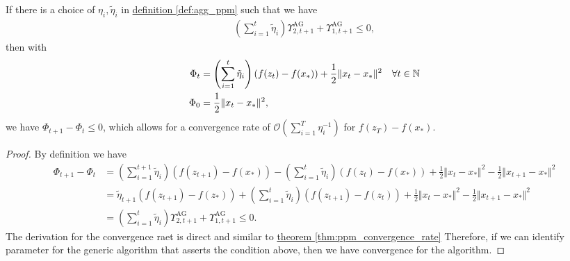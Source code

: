 \documentclass[12pt]{article}
\begin{document}
        \begin{theorem}\label{thm:generic_smooth_ag_convergence}
            If there is a choice of $\eta_i, \tilde \eta_i$ in \hyperref[def:agg_ppm]{definition \ref*{def:agg_ppm}} such that we have 
            \begin{align*}
                \left(
                    \sum_{i = 1}^{t} \tilde \eta_i
                \right)
                \Upsilon_{2, t + 1}^{\text{AG}} + 
                \Upsilon_{1, t + 1}^{\text{AG}} \le 0, 
            \end{align*}
            then with 
            \begin{align*}
                \Phi_t &= \left(
                    \sum_{i = 1}^{t} \tilde\eta_{i}
                \right) (f(z_t) - f(x_*)) + \frac{1}{2}\Vert x_t - x_*\Vert^2 \quad \forall t \in \mathbb N
                \\
                \Phi_0 &= \frac{1}{2}\Vert x_t - x_*\Vert^2, 
            \end{align*}
            we have $\Phi_{t + 1} - \Phi_t \le 0$, which allows for a convergence rate of $\mathcal O \left(\sum_{i = 1}^{T} \eta_i^{-1}\right)$ for $f(z_T) - f(x_*)$. 
        \end{theorem}
        \begin{proof}
            By definition we have
            {\footnotesize
            \begin{align*}
                \Phi_{t + 1} - \Phi_t 
                &= 
                \left(
                    \sum_{i = 1}^{t+1} \tilde\eta_{i}
                \right) (f(z_{t + 1}) - f(x_*)) 
                - 
                \left(
                    \sum_{i = 1}^{t} \tilde\eta_{i}
                \right) (f(z_{t}) - f(x_*)) 
                + \frac{1}{2}\Vert x_t - x_*\Vert^2
                - \frac{1}{2}\Vert x_{t + 1} - x_*\Vert^2
                \\
                &= 
                \tilde \eta_{t + 1} (f(z_{t + 1}) - f(z_*))
                +
                \left(
                    \sum_{i = 1}^{t} \tilde \eta_i
                \right)(f(z_{t + 1}) - f(z_t))
                + \frac{1}{2}\Vert x_t - x_*\Vert^2
                - \frac{1}{2}\Vert x_{t + 1} - x_*\Vert^2
                \\
                &= \left(
                    \sum_{i = 1}^{t} \tilde \eta_i
                \right)\Upsilon_{2, t + 1}^{\text{AG}} + \Upsilon_{1, t + 1}^{\text{AG}} \le 0. 
            \end{align*}
            }
            The derivation for the convergence raet is direct and similar to 
            \hyperref[thm:ppm_convergence_rate]{theorem \ref*{thm:ppm_convergence_rate}} 
            Therefore, if we can identify parameter for the generic algorithm that asserts the condition above, then we have convergence for the algorithm. 
        \end{proof}
\end{document}

